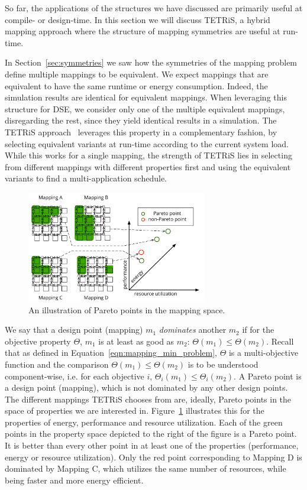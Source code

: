 So far, the applications of the structures we have discussed are primarily useful at compile- or design-time.
In this section we will discuss \acs{TETRiS}, a hybrid mapping approach where the structure of mapping symmetries are useful at run-time.

In Section~\ref{sec:symmetries} we saw how the symmetries of the mapping problem define multiple mappings to be equivalent.
We expect mappings that are equivalent to have the same runtime or energy consumption. Indeed, the simulation results are identical for equivalent mappings.
When leveraging this structure for \ac{DSE}, we consider only one of the multiple equivalent mappings, disregarding the rest, since they yield identical results in a simulation.
The \acf{TETRiS} approach~\cite{goens_scopes17} leverages this property in a complementary fashion, by selecting equivalent variants at run-time according to the current system load.
While this works for a single mapping, the strength of \ac{TETRiS} lies in selecting from different mappings with different properties first and using the equivalent variants to find a multi-application schedule.

\begin{figure}[th]
	\centering
	\includegraphics[width=0.7\textwidth]{figures/pareto_mappings.pdf}
	\caption{An illustration of Pareto points in the mapping space.}
	\label{fig:tetris_pareto}
\end{figure}

We say that a design point (mapping) $m_1$ \emph{dominates} another $m_2$ if for the objective property $\Theta$, $m_1$ is at least as good as $m_2$: $\Theta(m_1) \leq \Theta(m_2)$. 
Recall that as defined in Equation~\ref{eqn:mapping_min_problem}, $\Theta$ is a multi-objective function and the comparison $\Theta(m_1) \leq \Theta(m_2)$ is to be understood component-wise, i.e. for each objective $i$, $\Theta_i(m_1) \leq \Theta_i(m_2)$.
A Pareto point is a design point (mapping), which is not dominated by any other design points. 
The different mappings \ac{TETRiS} chooses from are, ideally, Pareto points in the space of properties we are interested in.
Figure~\ref{fig:tetris_pareto} illustrates this for the properties of energy, performance and resource utilization.
Each of the green points in the property space depicted to the right of the figure is a Pareto point.
It is better than every other point in at least one of the properties (performance, energy or resource utilization).
Only the red point corresponding to Mapping D is dominated by Mapping C, which utilizes the same number of resources, while being faster and more energy efficient.


